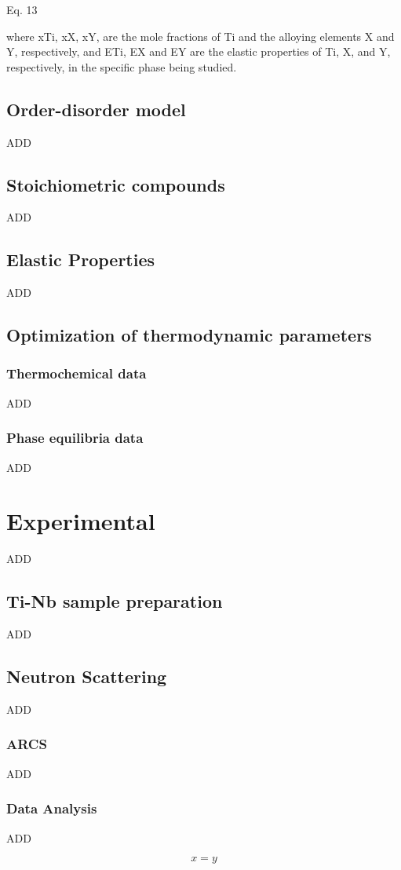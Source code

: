 Eq. 13

where xTi, xX, xY, are the mole fractions of Ti and the alloying elements X and Y, respectively, and ETi, EX and EY are the elastic properties of Ti, X, and Y, respectively, in the specific phase being studied. 



\subsection{Order-disorder model}

ADD

\subsection{Stoichiometric compounds}

ADD

\subsection{Elastic Properties}

ADD

\subsection{Optimization of thermodynamic parameters}

\subsubsection{Thermochemical data}

ADD

\subsubsection{Phase equilibria data}

ADD

\section{Experimental}

ADD

\subsection{Ti-Nb sample preparation}

ADD

\subsection{Neutron Scattering}

ADD

\subsubsection{ARCS}

ADD

\subsubsection{Data Analysis}

ADD

\begin{equation}
\label{eq: label}
x = y
\end{equation}
